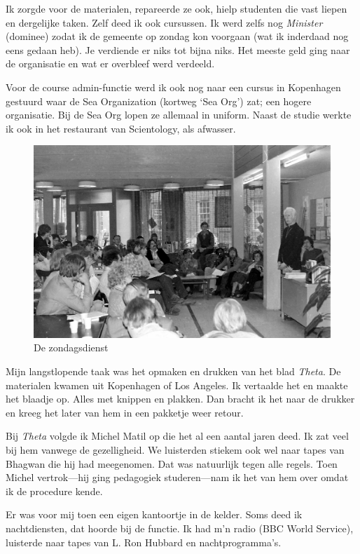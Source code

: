 \documentclass[12pt,twoside, openright]{memoir}
\begin{document}
Ik zorgde voor de materialen, repareerde ze ook, hielp studenten die vast liepen en dergelijke taken. Zelf deed ik ook cursussen. Ik werd zelfs nog \emph{Minister} (dominee) zodat ik de gemeente op zondag kon voorgaan (wat ik inderdaad nog eens gedaan heb). Je verdiende er niks tot bijna niks. Het meeste geld ging naar de organisatie en wat er overbleef werd verdeeld. 

Voor de course admin-functie werd ik ook nog naar een cursus in Kopenhagen gestuurd waar de Sea Organization (kortweg `Sea Org') zat; een hogere organisatie. Bij de Sea Org lopen ze allemaal in uniform. Naast de studie werkte ik ook in het restaurant van Scientology, als afwasser.

\begin{figure}
\centering
\includegraphics[width=\textwidth]{img/ch44/9-25-2009_002}
\caption*{\footnotesizePiet De zondagsdienst}
\end{figure}

Mijn langstlopende taak was het opmaken en drukken van het blad \emph{Theta}. De materialen kwamen uit Kopenhagen of Los Angeles. Ik vertaalde het en maakte het blaadje op. Alles met knippen en plakken. Dan bracht ik het naar de drukker en kreeg het later van hem in een pakketje weer retour. 

Bij \emph{Theta} volgde ik Michel Matil op die het al een aantal jaren deed. Ik zat veel bij hem vanwege de gezelligheid. We luisterden stiekem ook wel naar tapes van Bhagwan die hij had meegenomen. Dat was natuurlijk tegen alle regels. Toen Michel vertrok---hij ging pedagogiek studeren---nam ik het van hem over omdat ik de procedure kende. 

Er was voor mij toen een eigen kantoortje in de kelder. Soms deed ik nachtdiensten, dat hoorde bij de functie. Ik had m’n radio (BBC World Service), luisterde naar tapes van L. Ron Hubbard en nachtprogramma’s. 
\end{document}
